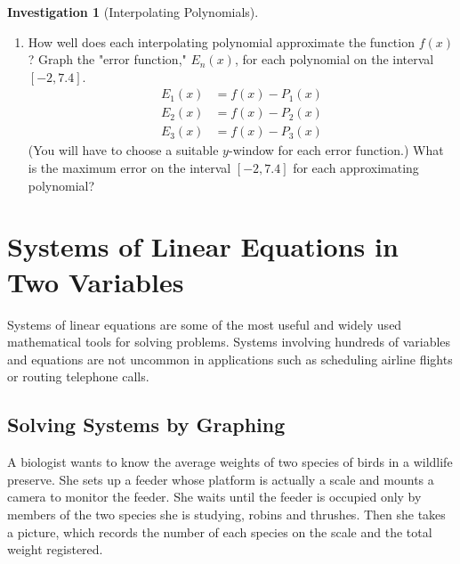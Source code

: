 \documentclass[10pt,]{book}
\theoremstyle{plain}
\theoremstyle{definition}
\theoremstyle{definition}
\theoremstyle{definition}
\newtheorem{investigation}[project]{Investigation}
\theoremstyle{definition}
\numberwithin{equation}{section}
\newcommand{\amp}{ & }
\begin{document}
\begin{investigation}[Interpolating Polynomials]
\begin{enumerate}[label=*\arabic**]
\item\hypertarget{li-14}{}
			How well does each interpolating polynomial approximate the function \(f(x)\)? Graph the "error function," \(E_n(x)\), for each polynomial on the interval \([−2, 7.4]\).
			\begin{align*}
E_1(x) \amp = f(x) − P_1(x)\\
E_2(x) \amp = f(x) − P_2(x)\\
E_3(x) \amp = f(x) − P_3(x)
\end{align*}
			(You will have to choose a suitable \(y\)-window for each error function.) What is the maximum error on the interval \([−2, 7.4]\) for each approximating polynomial?
\end{enumerate}

%
\end{investigation}
\typeout{************************************************}
\typeout{************************************************}
\section[Systems of Linear Equations in Two Variables]{Systems of Linear Equations in Two Variables}\label{Systems-of-Linear-Equations-in-Two-Variables}

	Systems of linear equations are some of the most useful and widely used mathematical tools for solving problems. Systems involving hundreds of variables and equations are not uncommon in applications such as scheduling airline flights or routing telephone calls.
%
\typeout{************************************************}
\typeout{************************************************}
\subsection[Solving Systems by Graphing]{Solving Systems by Graphing}\label{subsection-1}

	A biologist wants to know the average weights of two species of birds in a wildlife preserve. She sets up a feeder whose platform is actually a scale and mounts a camera to monitor the feeder. She waits until the feeder is occupied only by members of the two species she is studying, robins and thrushes. Then she takes a picture, which records the number of each species on the scale and the total weight registered.
%
\par
\end{document}
